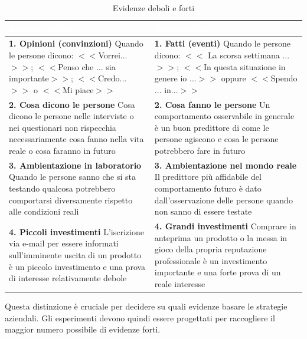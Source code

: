\begin{table}[ht]
\centering
{}
\footnotesize
\begin{tabular}{|p{7cm}|p{7cm}|}
\hline
\rowcolor{headerblue}
\textbf{\textcolor{white}{Evidenze deboli}} & \textbf{\textcolor{white}{Evidenze forti}}\\\hline
\textbf{1. Opinioni (convinzioni)}\newline
Quando le persone dicono:\newline
$<<$Vorrei...$>>$; $<<$Penso che ... sia importante$>>$; $<<$Credo...$>>$ o $<<$Mi
piace$>>$
&
\textbf{1. Fatti (eventi)}\newline
Quando le persone dicono:\newline
$<<$ La scorsa settimana ...$>>$; $<<$In questa situazione in genere io
...$>>$ oppure $<<$Spendo ... in...$>>$
\\\hline
\textbf{2. Cosa dicono le persone}\newline
Cosa dicono le persone nelle interviste o nei questionari non rispecchia necessariamente cosa fanno nella vita reale o cosa faranno in futuro
&
\textbf{2. Cosa fanno le persone}\newline
Un comportamento osservabile in generale è un buon predittore di come le persone agiscono e cosa le persone potrebbero fare in futuro
\\\hline
\textbf{3. Ambientazione in laboratorio}\newline
Quando le persone sanno che si sta testando qualcosa potrebbero comportarsi diversamente rispetto alle condizioni reali
&
\textbf{3. Ambientazione nel mondo reale}\newline
Il predittore più affidabile del comportamento futuro è dato dall’osservazione delle persone quando non sanno di essere testate
\\\hline
\textbf{4. Piccoli investimenti}\newline
L'iscrizione via e-mail per essere informati sull'imminente uscita di un prodotto è un piccolo investimento e una prova di interesse relativamente debole
&
\textbf{4. Grandi investimenti}\newline
Comprare in anteprima un prodotto o la messa in gioco della propria reputazione professionale è un investimento importante e una forte prova di un reale interesse
\\\hline
\end{tabular}
\caption{Evidenze deboli e forti}
\end{table}
Questa distinzione è cruciale per decidere su quali evidenze basare le strategie aziendali. Gli esperimenti devono quindi essere progettati per raccogliere il maggior numero possibile di evidenze forti.

